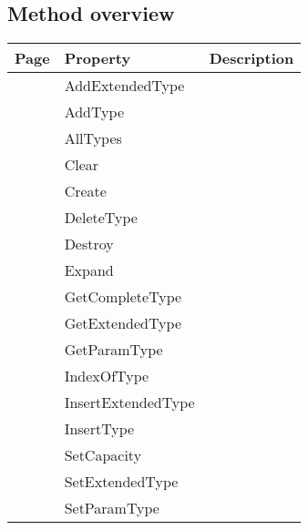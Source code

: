 \subsection{Method overview}
\label{thoriumcore:thorium:tthoriumhostfunctionparameterspec:methods}
\begin{tabularx}{\textwidth}{llX}
Page & Property & Description  \\ \hline
\pageref{thoriumcore:thorium:tthoriumhostfunctionparameterspec:addextendedtype} & AddExtendedType  &  \\
\pageref{thoriumcore:thorium:tthoriumhostfunctionparameterspec:addtype} & AddType  &  \\
\pageref{thoriumcore:thorium:tthoriumhostfunctionparameterspec:alltypes} & AllTypes  &  \\
\pageref{thoriumcore:thorium:tthoriumhostfunctionparameterspec:clear} & Clear  &  \\
\pageref{thoriumcore:thorium:tthoriumhostfunctionparameterspec:create} & Create  &  \\
\pageref{thoriumcore:thorium:tthoriumhostfunctionparameterspec:deletetype} & DeleteType  &  \\
\pageref{thoriumcore:thorium:tthoriumhostfunctionparameterspec:destroy} & Destroy  &  \\
\pageref{thoriumcore:thorium:tthoriumhostfunctionparameterspec:expand} & Expand  &  \\
\pageref{thoriumcore:thorium:tthoriumhostfunctionparameterspec:getcompletetype} & GetCompleteType  &  \\
\pageref{thoriumcore:thorium:tthoriumhostfunctionparameterspec:getextendedtype} & GetExtendedType  &  \\
\pageref{thoriumcore:thorium:tthoriumhostfunctionparameterspec:getparamtype} & GetParamType  &  \\
\pageref{thoriumcore:thorium:tthoriumhostfunctionparameterspec:indexoftype} & IndexOfType  &  \\
\pageref{thoriumcore:thorium:tthoriumhostfunctionparameterspec:insertextendedtype} & InsertExtendedType  &  \\
\pageref{thoriumcore:thorium:tthoriumhostfunctionparameterspec:inserttype} & InsertType  &  \\
\pageref{thoriumcore:thorium:tthoriumhostfunctionparameterspec:setcapacity} & SetCapacity  &  \\
\pageref{thoriumcore:thorium:tthoriumhostfunctionparameterspec:setextendedtype} & SetExtendedType  &  \\
\pageref{thoriumcore:thorium:tthoriumhostfunctionparameterspec:setparamtype} & SetParamType  &  \\
\hline
\end{tabularx}
